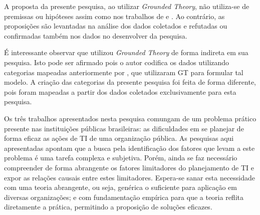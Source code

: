 A proposta da presente pesquisa, ao utilizar \textit{Grounded Theory}, não utiliza-se de premissas ou hipóteses assim como nos trabalhos de  e . Ao contrário, as proposições são levantadas na análise dos dados coletados e refutadas ou confirmadas também nos dados no desenvolver da pesquisa.

É interessante observar que  utilizou \textit{Grounded Theory} de forma indireta em sua pesquisa. Isto pode ser afirmado pois o autor codifica os dados utilizando categorias mapeadas anteriormente por , que utilizaram GT para formular tal modelo. A criação das categorias da presente pesquisa foi feita de forma diferente, pois foram mapeadas a partir dos dados coletados exclusivamente para esta pesquisa.

Os três trabalhos apresentados nesta pesquisa comungam de um problema prático presente nas instituições públicas brasileiras: as dificuldades em se planejar de forma eficaz as ações de TI de uma organização pública. As pesquisas aqui apresentadas apontam que a busca pela identificação dos fatores que levam a este problema é uma tarefa complexa e subjetiva. Porém, ainda se faz necessário compreender de forma abrangente os fatores limitadores do planejamento de TI e expor as relações causais entre estes limitadores. Espera-se sanar esta necessidade com uma teoria abrangente, ou seja, genérica o suficiente para aplicação em diversas organizações; e com fundamentação empírica para que a teoria reflita diretamente a prática, permitindo a proposição de soluções eficazes.


